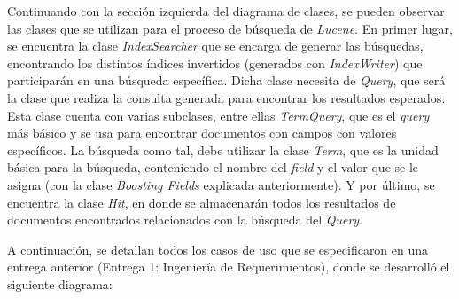 \documentclass{memoria}
\begin{document}
Continuando con la sección izquierda del diagrama de clases, se pueden observar las clases que se utilizan para el proceso de búsqueda de \textsl{Lucene}. En primer lugar, se encuentra la clase \textsl{IndexSearcher} que se encarga de generar las búsquedas, encontrando los distintos índices invertidos (generados con \textsl{IndexWriter}) que participarán en una búsqueda específica. Dicha clase necesita de \textsl{Query}, que será la clase que realiza la consulta generada para encontrar los resultados esperados. Esta clase cuenta con varias subclases, entre ellas \textsl{TermQuery}, que es el \textsl{query} más básico y se usa para encontrar documentos con campos con valores específicos. La búsqueda como tal, debe utilizar la clase \textsl{Term}, que es la unidad básica para la búsqueda, conteniendo el nombre del \textsl{field} y el valor que se le asigna (con la clase \textsl{Boosting Fields} explicada anteriormente). Y por último, se encuentra la clase \textsl{Hit}, en donde se almacenarán todos los resultados de documentos encontrados relacionados con la búsqueda del \textsl{Query}. 

\newpage
{}

 


A continuación, se detallan todos los casos de uso que se especificaron en una entrega anterior (Entrega 1: Ingeniería de Requerimientos), donde se desarrolló el siguiente diagrama:
\end{document}
